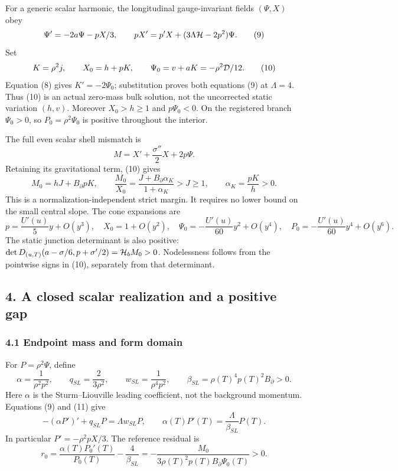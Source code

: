 \documentclass[
  11pt,
]{article}
\begin{document}
For a generic scalar harmonic, the longitudinal gauge-invariant fields
\((\Psi,X)\) obey \[
 \Psi'=-2a\Psi-pX/3,\qquad
 pX'=p'X+(3\Lambda{\cal H}-2p^2)\Psi.             \tag{9}
\] Set \[
 K=\rho^2j,\qquad
 X_0=h+pK,\qquad
 \Psi_0=v+aK=-\rho^2{\cal D}/12.
 \tag{10}
\] Equation (8) gives \(K'=-2\Psi_0\); substitution proves both
equations (9) at \(\Lambda=4\). Thus (10) is an actual zero-mass bulk
solution, not the uncorrected static variation \((h,v)\). Moreover
\(X_0>h\ge1\) and \(p\Psi_0<0\). On the registered branch \(\Psi_0>0\),
so \(P_0=\rho^2\Psi_0\) is positive throughout the interior.

The full even scalar shell mismatch is \[
 M=X'+\frac{\sigma''}{2}X+2p\Psi.
 \tag{11}
\] Retaining its gravitational term, (10) gives \[
 M_0=hJ+B_\partial pK,\qquad
 \frac{M_0}{X_0}
 =\frac{J+B_\partial\alpha_K}{1+\alpha_K}>J\ge1,
 \qquad \alpha_K=\frac{pK}{h}>0.                       \tag{12}
\] This is a normalization-independent strict margin. It requires no
lower bound on the small central slope. The cone expansions are \[
 p=\frac{U'(u)}5y+O(y^3),\quad
 X_0=1+O(y^2),\quad
 \Psi_0=-\frac{U'(u)}{60}y^2+O(y^4),\quad
 P_0=-\frac{U'(u)}{60}y^4+O(y^6).
 \tag{13}
\] The static junction determinant is also positive:
\(\det D_{(u,T)}(a-\sigma/6,p+\sigma'/2)={\cal H}_bM_0>0\). Nodelessness
follows from the pointwise signs in (10), separately from that
determinant.

\subsection{4. A closed scalar realization and a positive
gap}\label{a-closed-scalar-realization-and-a-positive-gap}

\subsubsection{4.1 Endpoint mass and form
domain}\label{endpoint-mass-and-form-domain}

For \(P=\rho^2\Psi\), define \[
 \alpha=\frac1{\rho^2p^2},\qquad
 q_{SL}=\frac2{3\rho^2},\qquad
 w_{SL}=\frac1{\rho^4p^2},\qquad
 \beta_{SL}=\rho(T)^4p(T)^2B_\partial>0.
 \tag{14}
\] Here \(\alpha\) is the Sturm--Liouville leading coefficient, not the
background momentum. Equations (9) and (11) give \[
 -(\alpha P')'+q_{SL}P=\Lambda w_{SL}P,\qquad
 \alpha(T)P'(T)=\frac{\Lambda}{\beta_{SL}}P(T).
 \tag{15}
\] In particular \(P'=-\rho^2pX/3\). The reference residual is \[
 r_0=\frac{\alpha(T)P_0'(T)}{P_0(T)}-\frac4{\beta_{SL}}
 =-\frac{M_0}{3\rho(T)^2p(T)B_\partial\Psi_0(T)}>0.
 \tag{16}
\]
\end{document}
